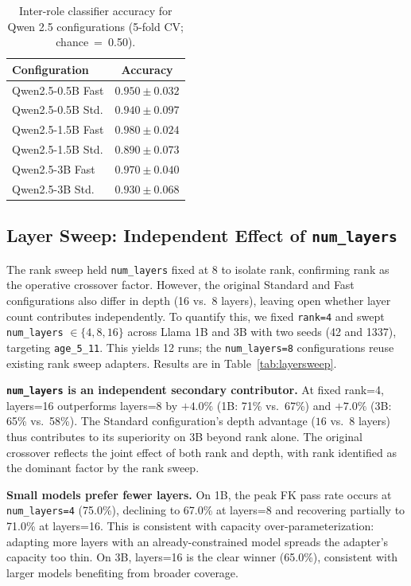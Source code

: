 \documentclass[journal]{IEEEtai}
\begin{document}
\begin{table}[!t]
  \centering
  \caption{Inter-role classifier accuracy for Qwen 2.5 configurations (5-fold CV; chance~=~0.50).}
  \label{tab:qwen25clf}
  \small
  \begin{tabular}{lc}
    \hline
    Configuration     & Accuracy \\
    \hline
    Qwen2.5-0.5B Fast & $0.950 \pm 0.032$ \\
    Qwen2.5-0.5B Std. & $0.940 \pm 0.097$ \\
    Qwen2.5-1.5B Fast & $\mathbf{0.980 \pm 0.024}$ \\
    Qwen2.5-1.5B Std. & $0.890 \pm 0.073$ \\
    Qwen2.5-3B Fast   & $0.970 \pm 0.040$ \\
    Qwen2.5-3B Std.   & $0.930 \pm 0.068$ \\
    \hline
  \end{tabular}
\end{table}

\subsection{Layer Sweep: Independent Effect of \texttt{num\_layers}}\label{sec:layersweep}

The rank sweep held \texttt{num\_layers} fixed at 8 to isolate rank, confirming rank as the operative crossover factor. However, the original Standard and Fast configurations also differ in depth (16 vs.\ 8 layers), leaving open whether layer count contributes independently. To quantify this, we fixed \texttt{rank=4} and swept \texttt{num\_layers} $\in \{4, 8, 16\}$ across Llama 1B and 3B with two seeds (42 and 1337), targeting \texttt{age\_5\_11}. This yields 12 runs; the \texttt{num\_layers=8} configurations reuse existing rank sweep adapters. Results are in Table~\ref{tab:layersweep}.

\textbf{\texttt{num\_layers} is an independent secondary contributor.} At fixed rank=4, layers=16 outperforms layers=8 by $+4.0\%$ (1B: 71\% vs.\ 67\%) and $+7.0\%$ (3B: 65\% vs.\ 58\%). The Standard configuration's depth advantage ($16$ vs.\ $8$ layers) thus contributes to its superiority on 3B beyond rank alone. The original crossover reflects the joint effect of both rank and depth, with rank identified as the dominant factor by the rank sweep.

\textbf{Small models prefer fewer layers.} On 1B, the peak FK pass rate occurs at \texttt{num\_layers=4} (75.0\%), declining to 67.0\% at layers=8 and recovering partially to 71.0\% at layers=16. This is consistent with capacity over-parameterization: adapting more layers with an already-constrained model spreads the adapter's capacity too thin. On 3B, layers=16 is the clear winner (65.0\%), consistent with larger models benefiting from broader coverage.
\end{document}

